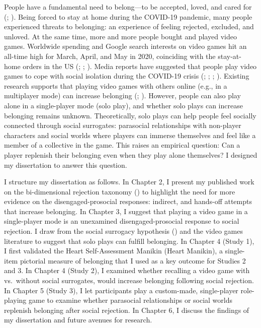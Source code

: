 \documentclass[
]{udthesis}
\begin{document}
People have a fundamental need to belong---to be accepted, loved, and
cared for (; ). Being forced to stay at home
during the COVID-19 pandemic, many people experienced threats to
belonging: an experience of feeling rejected, excluded, and unloved. At
the same time, more and more people bought and played video games.
Worldwide spending and Google search interests on video games hit an
all-time high for March, April, and May in 2020, coinciding with the
stay-at-home orders in the US (; ; ). Media reports have suggested that people play
video games to cope with social isolation during the COVID-19 crisis
(; ; ; ). Existing
research supports that playing video games with others online (e.g., in
a multiplayer mode) can increase belonging (; ).
However, people can also play alone in a single-player mode (solo play),
and whether solo plays can increase belonging remains unknown.
Theoretically, solo plays can help people feel socially connected
through social surrogates: parasocial relationships with non-player
characters and social worlds where players can immerse themselves and
feel like a member of a collective in the game. This raises an empirical
question: Can a player replenish their belonging even when they play
alone themselves? I designed my dissertation to answer this question.

I structure my dissertation as follows. In Chapter 2, I present my
published work on the bi-dimensional rejection taxonomy ()
to highlight the need for more evidence on the disengaged-prosocial
responses: indirect, and hands-off attempts that increase belonging. In
Chapter 3, I suggest that playing a video game in a single-player mode
is an unexamined disengaged-prosocial response to social rejection. I
draw from the social surrogacy hypothesis () and the video
games literature to suggest that solo plays can fulfill belonging. In
Chapter 4 (Study 1), I first validated the Heart Self-Assessment Manikin
(Heart Manikin), a single-item pictorial measure of belonging that I
used as a key outcome for Studies 2 and 3. In Chapter 4 (Study 2), I
examined whether recalling a video game with vs.~without social
surrogates, would increase belonging following social rejection. In
Chapter 5 (Study 3), I let participants play a custom-made,
single-player role-playing game to examine whether parasocial
relationships or social worlds replenish belonging after social
rejection. In Chapter 6, I discuss the findings of my dissertation and
future avenues for research.
\end{document}
